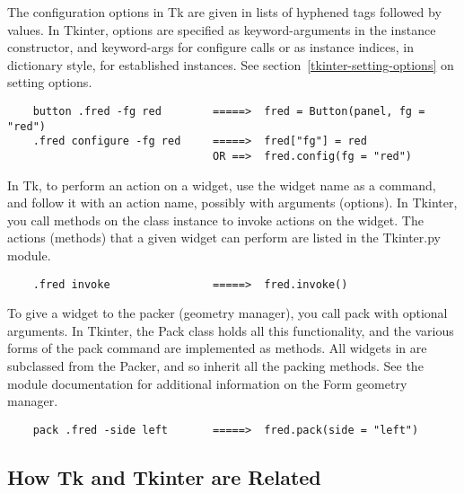 The configuration options in Tk are given in lists of hyphened tags
followed by values.  In Tkinter, options are specified as
keyword-arguments in the instance constructor, and keyword-args for
configure calls or as instance indices, in dictionary style, for
established instances.  See section~\ref{tkinter-setting-options} on
setting options.

\begin{verbatim}
    button .fred -fg red        =====>  fred = Button(panel, fg = "red")
    .fred configure -fg red     =====>  fred["fg"] = red
                                OR ==>  fred.config(fg = "red")
\end{verbatim}

In Tk, to perform an action on a widget, use the widget name as a
command, and follow it with an action name, possibly with arguments
(options).  In Tkinter, you call methods on the class instance to
invoke actions on the widget.  The actions (methods) that a given
widget can perform are listed in the Tkinter.py module.

\begin{verbatim}
    .fred invoke                =====>  fred.invoke()
\end{verbatim}

To give a widget to the packer (geometry manager), you call pack with
optional arguments.  In Tkinter, the Pack class holds all this
functionality, and the various forms of the pack command are
implemented as methods.  All widgets in  are
subclassed from the Packer, and so inherit all the packing
methods. See the  module documentation for additional
information on the Form geometry manager.

\begin{verbatim}
    pack .fred -side left       =====>  fred.pack(side = "left")
\end{verbatim}


\subsection{How Tk and Tkinter are Related} %


